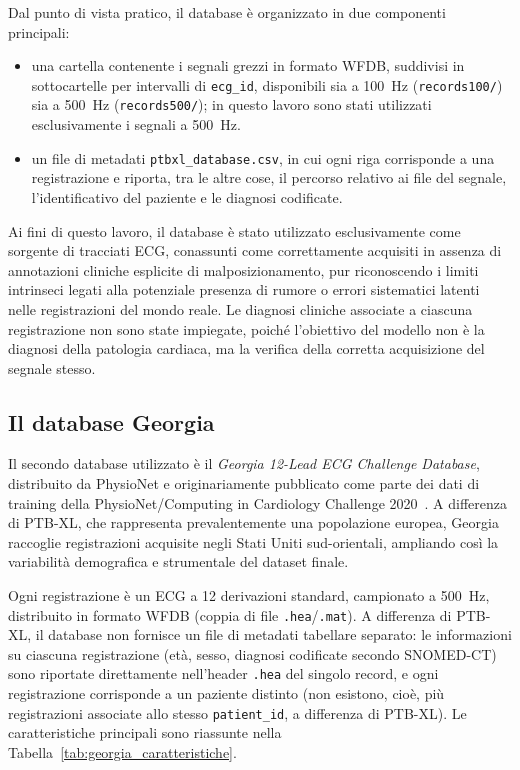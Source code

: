 Dal punto di vista pratico, il database è organizzato in due componenti principali:

\begin{itemize}
	\item una cartella contenente i segnali grezzi in formato WFDB, suddivisi in sottocartelle per intervalli di \texttt{ecg\_id}, disponibili sia a \SI{100}{Hz} (\texttt{records100/}) sia a \SI{500}{Hz} (\texttt{records500/}); in questo lavoro sono stati utilizzati esclusivamente i segnali a \SI{500}{Hz}.
	\item un file di metadati \texttt{ptbxl\_database.csv}, in cui ogni riga corrisponde a una registrazione e riporta, tra le altre cose, il percorso relativo ai file del segnale, l'identificativo del paziente e le diagnosi codificate.
\end{itemize}

Ai fini di questo lavoro, il database è stato utilizzato esclusivamente come sorgente di tracciati ECG, conassunti come correttamente acquisiti in assenza di annotazioni cliniche esplicite di malposizionamento, pur riconoscendo i limiti intrinseci legati alla potenziale presenza di rumore o errori sistematici latenti nelle registrazioni del mondo reale. Le diagnosi cliniche associate a ciascuna registrazione non sono state impiegate, poiché l'obiettivo del modello non è la diagnosi della patologia cardiaca, ma la verifica della corretta acquisizione del segnale stesso.

\subsection{Il database Georgia}

Il secondo database utilizzato è il \emph{Georgia 12-Lead ECG Challenge Database}, distribuito da PhysioNet e originariamente pubblicato come parte dei dati di training della PhysioNet/Computing in Cardiology Challenge 2020~\cite{alday2020georgia}. A differenza di PTB-XL, che rappresenta prevalentemente una popolazione europea, Georgia raccoglie registrazioni acquisite negli Stati Uniti sud-orientali, ampliando così la variabilità demografica e strumentale del dataset finale.

Ogni registrazione è un ECG a 12 derivazioni standard, campionato a \SI{500}{Hz}, distribuito in formato WFDB (coppia di file \texttt{.hea}/\texttt{.mat}). A differenza di PTB-XL, il database non fornisce un file di metadati tabellare separato: le informazioni su ciascuna registrazione (età, sesso, diagnosi codificate secondo SNOMED-CT) sono riportate direttamente nell'header \texttt{.hea} del singolo record, e ogni registrazione corrisponde a un paziente distinto (non esistono, cioè, più registrazioni associate allo stesso \texttt{patient\_id}, a differenza di PTB-XL). Le caratteristiche principali sono riassunte nella Tabella~\ref{tab:georgia_caratteristiche}.

